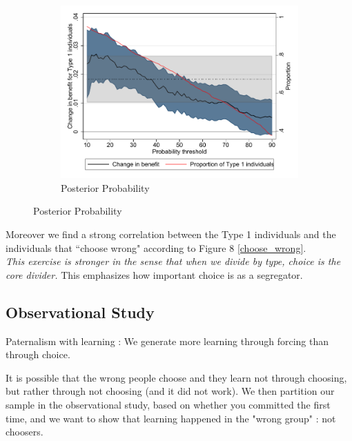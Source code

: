 \documentclass[oneside,11pt]{article}
\begin{document}
\begin{figure}[H]
    \caption{Type 1 class vs HTE}
    \label{}
    \begin{center}
    \begin{subfigure}{0.7\textwidth}
        \caption{Posterior Probability}
        \centering
        \includegraphics[width=\textwidth]{Figuras/benefit_type1p.pdf}
    \end{subfigure}
  
    \end{center}
     \scriptsize 
\end{figure}



Moreover we find a strong correlation between the Type 1 individuals and the individuals that ``choose wrong" according to Figure 8 \ref{choose_wrong}.\\

\emph{This exercise is stronger in the sense that when we divide by type, choice is the core divider.} This emphasizes how important choice is as a segregator.


\subsection{Observational Study}

Paternalism  with learning : We generate more learning through forcing than through choice.

It is possible that the wrong people choose and they learn not through choosing, but rather through not choosing (and it did not work). We then partition our sample in the observational study, based on whether you committed the first time, and we want to show that learning happened in the "wrong group" : not choosers.
\end{document}
